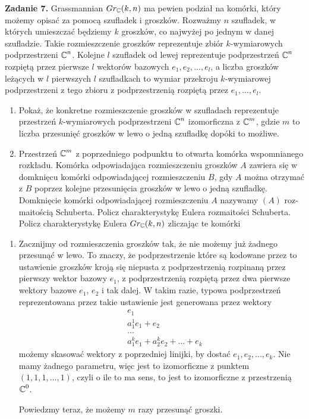 \textbf{\large\color{orange}Zadanie 7.} Grassmannian $Gr_{\operatorname{\mathbb{C}}}(k, n)$ ma pewien podział na komórki, który możemy opisać za pomocą szufladek i groszków. Rozważmy $n$ szufladek, w których umieszczać będziemy $k$ groszków, co najwyżej po jednym w danej szufladzie. Takie rozmieszczenie groszków reprezentuje zbiór $k$-wymiarowych podprzestrzeni $\operatorname{\mathbb{C}}^n$. Kolejne $l$ szufladek od lewej reprezentuje podprzestrzeń $\operatorname{\mathbb{C}}^n$ rozpiętą przez pierwsze $l$ wektorów bazowych $e_1, e_2,..., e_l$, a liczba groszków leżących w $l$ pierwszych $l$ szufladkach to wymiar przekroju $k$-wymiarowej podprzestrzeni z tego zbioru z podprzestrzenią rozpiętą przez $e_1,..., e_l$.
\begin{enumerate}[label=(\alph*)]
  \item Pokaż, że konkretne rozmieszczenie groszków w szufladach reprezentuje przestrzeń $k$-wymiarowych podprzestrzeni $\operatorname{\mathbb{C}}^n$ izomorficzna z $\operatorname{\mathbb{C}}^m$, gdzie $m$ to liczba przesunięć groszków w lewo o jedną szufladkę dopóki to możliwe.
  \item Przestrzeń $\operatorname{\mathbb{C}}^m$ z poprzedniego podpunktu to otwarta komórka wspomnianego rozkładu. Komórka odpowiadająca rozmieszczeniu groszków $A$ zawiera się w
domknięcu komórki odpowiadającej rozmieszczeniu $B$, gdy $A$ można otrzymać z $B$ poprzez kolejne przesunięcia groszków w lewo o jedną szufladkę.
Domknięcie komórki odpowiadającej rozmieszczeniu $A$ nazywamy $(A)$ roz-
maitością Schuberta. Policz charakterystykę Eulera rozmaitości Schuberta.
Policz charakterystykę Eulera $Gr_{\operatorname{\mathbb{C}}}(k, n)$ zliczając te komórki
\end{enumerate}

\dotfill 

\begin{enumerate}[label=\textbf{(\alph*)}]
  \item Zacznijmy od rozmieszczenia groszków tak, że nie możemy już żadnego przesunąć w lewo. To znaczy, że podprzestrzenie które są kodowane przez to ustawienie groszków kroją się niepusta z podprzestrzenią rozpinaną przez pierwszy wektor bazowy $e_1$, z podprzestrzenią rozpiętą przez dwa pierwsze wektory bazowe $e_1$, $e_2$ i tak dalej. W takim razie, typowa podprzestrzeń reprezentowana przez takie ustawienie jest generowana przez wektory
    \begin{align*}
      &e_1\\ 
      &a_1^1e_1+e_2\\ 
      &...\\ 
      &a_1^ke_1+a_2^ke_2+...+e_k
    \end{align*}
    możemy skasować wektory z poprzedniej linijki, by dostać $e_1, e_2, ...,e_k$. Nie mamy żadnego parametru, więc jest to izomorficzne z punktem $(1, 1, 1, ..., 1)$, czyli o ile to ma sens, to jest to izomorficzne z przestrzenią $\operatorname{\mathbb{C}}^0$.

    Powiedzmy teraz, że możemy $m$ razy przesunąć groszki. 
\end{enumerate}
